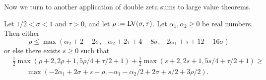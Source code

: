 Now we turn to another application of double zeta sums to large value theorems.

    \begin{theorem}\label{bourgain-lvt} \cite{bourgain_large_2000} Let $1/2 < \sigma < 1$ and $\tau > 0$, and let $\rho := \mathrm{LV}(\sigma,\tau)$.  Let $\alpha_1, \alpha_2 \geq 0$ be real numbers.  Then either
    \begin{equation}\label{rho1}
     \rho \leq \max( \alpha_2 + 2 - 2 \sigma, -\alpha_2 + 2\tau+4-8\sigma, -2\alpha_1 + \tau + 12 - 16 \sigma)
    \end{equation}
    or else there exists $s \geq 0$ such that
    \begin{equation}\label{rs}
    \begin{split}
         &\frac{1}{2}\max(\rho+2, 2\rho+1, 5\rho/4 + \tau/2 + 1) + \frac{1}{2}\max(s+2, 2s+1, 5s/4 + \tau/2 + 1) \geq \\
            &\qquad\max( -2\alpha_1 + 2\sigma + s + \rho, -\alpha_1 - \alpha_2/2 + 2\sigma + s/2 + 3\rho/2).
    \end{split}
    \end{equation}
    \end{theorem}

